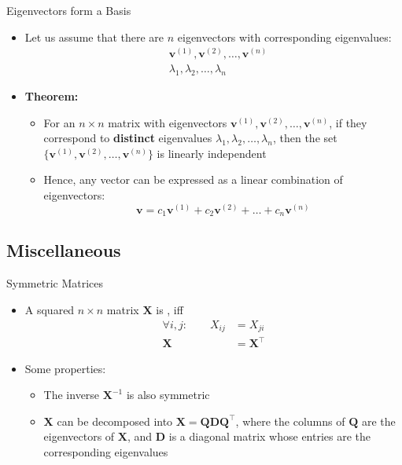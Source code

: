 \begin{frame}{Eigenvectors form a Basis}{}
	\begin{itemize}
		\item Let us assume that there are $n$ eigenvectors with corresponding eigenvalues:
		\begin{align*}
			&\bm{v}^{(1)}, \bm{v}^{(2)}, \dots, \bm{v}^{(n)} \\
			&\lambda_1, \lambda_2, \dots, \lambda_n
		\end{align*}
		\item \textbf{Theorem:}
		\begin{itemize}
			\item For an $n \times n$ matrix with eigenvectors $\bm{v}^{(1)}, \bm{v}^{(2)}, \dots, \bm{v}^{(n)}$,
				if they correspond to \textbf{distinct} eigenvalues $\lambda_1, \lambda_2, \dots, \lambda_n$,
				then the set $\{ \bm{v}^{(1)}, \bm{v}^{(2)}, \dots, \bm{v}^{(n)} \}$ is linearly independent
			\item Hence, any vector can be expressed as a linear combination of eigenvectors:
			\begin{equation*}
				\bm{v} = c_1 \bm{v}^{(1)} + c_2 \bm{v}^{(2)} + \dots + c_n \bm{v}^{(n)}
			\end{equation*}
		\end{itemize}
	\end{itemize}
\end{frame}


\subsection{Miscellaneous}

\begin{frame}{Symmetric Matrices}{}
	\begin{itemize}
		\item A squared $n \times n$ matrix $\bm{X}$ is , iff
		\begin{align}
			\forall i, j: \qquad X_{ij}
				&= X_{ji} \\
			\bm{X}
				&= \bm{X}^{\intercal}
		\end{align}
		\item Some properties:
		\begin{itemize}
			\item The inverse $\bm{X}^{-1}$ is also symmetric
			\item {} $\bm{X}$ can be decomposed into $\bm{X} = \bm{Q} \bm{D} \bm{Q}^{\intercal}$,
				where the columns of $\bm{Q}$ are the eigenvectors of $\bm{X}$, and $\bm{D}$ is a diagonal matrix whose
				entries are the corresponding eigenvalues
		\end{itemize}
	\end{itemize}
\end{frame}


